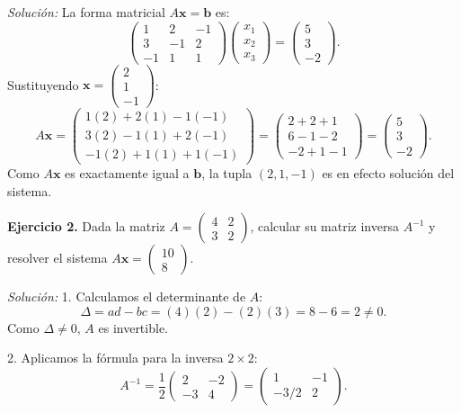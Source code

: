 \documentclass[11pt,letterpaper]{article}
\theoremstyle{definition}
\theoremstyle{plain}
\newcommand{\vv}[1]{\mathbf{#1}}
\begin{document}
\emph{Solución:}
La forma matricial $A\vv{x}=\vv{b}$ es:
\[
\begin{pmatrix} 1 & 2 & -1 \\ 3 & -1 & 2 \\ -1 & 1 & 1 \end{pmatrix} \begin{pmatrix} x_1 \\ x_2 \\ x_3 \end{pmatrix} = \begin{pmatrix} 5 \\ 3 \\ -2 \end{pmatrix}.
\]
Sustituyendo $\vv{x} = \begin{pmatrix} 2 \\ 1 \\ -1 \end{pmatrix}$:
\[
A\vv{x} = \begin{pmatrix} 1(2) + 2(1) - 1(-1) \\ 3(2) - 1(1) + 2(-1) \\ -1(2) + 1(1) + 1(-1) \end{pmatrix} = \begin{pmatrix} 2 + 2 + 1 \\ 6 - 1 - 2 \\ -2 + 1 - 1 \end{pmatrix} = \begin{pmatrix} 5 \\ 3 \\ -2 \end{pmatrix}.
\]
Como $A\vv{x}$ es exactamente igual a $\vv{b}$, la tupla $(2, 1, -1)$ es en efecto solución del sistema.

\vspace{0.3cm}
\textbf{Ejercicio 2.} Dada la matriz $A = \begin{pmatrix} 4 & 2 \\ 3 & 2 \end{pmatrix}$, calcular su matriz inversa $A^{-1}$ y resolver el sistema $A\vv{x} = \begin{pmatrix} 10 \\ 8 \end{pmatrix}$.

\emph{Solución:}
1. Calculamos el determinante de $A$:
\[
\Delta = ad - bc = (4)(2) - (2)(3) = 8 - 6 = 2 \neq 0.
\]
Como $\Delta \neq 0$, $A$ es invertible.

2. Aplicamos la fórmula para la inversa $2\times 2$:
\[
A^{-1} = \frac{1}{2} \begin{pmatrix} 2 & -2 \\ -3 & 4 \end{pmatrix} = \begin{pmatrix} 1 & -1 \\ -3/2 & 2 \end{pmatrix}.
\]
\end{document}
